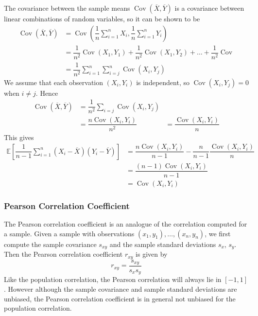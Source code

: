 \documentclass[11pt]{report} %
\begin{document}
The covariance between the sample means $\operatorname{Cov}\left(\overline{X},\overline{Y}\right)$ is a covariance between linear combinations of random variables, so it can be shown to be
\begin{align}
\operatorname{Cov}\left(\overline{X},\overline{Y}\right) &= \operatorname{Cov}\left(\dfrac{1}{n}\sum_{i=1}^{n}X_{i},\dfrac{1}{n}\sum_{i=1}^{n}Y_{i}\right) \\
&= \dfrac{1}{n^{2}}\operatorname{Cov}\left(X_{1},Y_{1}\right)+\dfrac{1}{n^{2}}\operatorname{Cov}\left(X_{1},Y_{2}\right)+\dots+\dfrac{1}{n^{2}}\operatorname{Cov} \\
&= \dfrac{1}{n^{2}}\sum_{i=1}^{n}\sum_{i=j}^{n}\operatorname{Cov}\left(X_{i},Y_{j}\right)
\end{align}
We assume that each observation $\left(X_{i}, Y_{i}\right)$ is independent, so $\operatorname{Cov}\left(X_{i},Y_{j}\right) = 0$ when $i \neq j$. Hence
\begin{align}
\operatorname{Cov}\left(\overline{X},\overline{Y}\right) &= \dfrac{1}{n^{2}}\sum_{i=j}\operatorname{Cov}\left(X_{i},Y_{j}\right) \\
&= \dfrac{n\operatorname{Cov}\left(X_{i}, Y_{i}\right)}{n^2}
&= \dfrac{\operatorname{Cov}\left(X_{i}, Y_{i}\right)}{n}
\end{align}
This gives
\begin{align}
\mathbb{E}\left[\dfrac{1}{n-1}\sum_{i=1}^{n}\left(X_{i}-\overline{X}\right)\left(Y_{i}-\overline{Y}\right)\right] &= \dfrac{n\operatorname{Cov}\left(X_{i},Y_{i}\right)}{n-1}-\dfrac{n}{n-1}\dfrac{\operatorname{Cov}\left(X_{i}, Y_{i}\right)}{n} \\
&= \dfrac{\left(n - 1\right)\operatorname{Cov}\left(X_{i}, Y_{i}\right)}{n - 1} \\
&= \operatorname{Cov}\left(X_{i}, Y_{i}\right)
\end{align}

\subsubsection{Pearson Correlation Coefficient}

The Pearson correlation coefficient is an analogue of the correlation computed for a sample. Given a sample with observations $\left(x_{1}, y_{1}\right), \dots, \left(x_{n}, y_{n}\right)$, we first compute the sample covariance $s_{xy}$ and the sample standard deviations $s_{x}$, $s_{y}$. Then the Pearson correlation coefficient $r_{xy}$ is given by
\begin{equation}
r_{xy} = \dfrac{s_{xy}}{s_{x}s_{y}}
\end{equation}
Like the population correlation, the Pearson correlation will always lie in $\left[-1, 1\right]$. However although the sample covariance and sample standard deviations are unbiased, the Pearson correlation coefficient is in general not unbiased for the population correlation.
\end{document}
